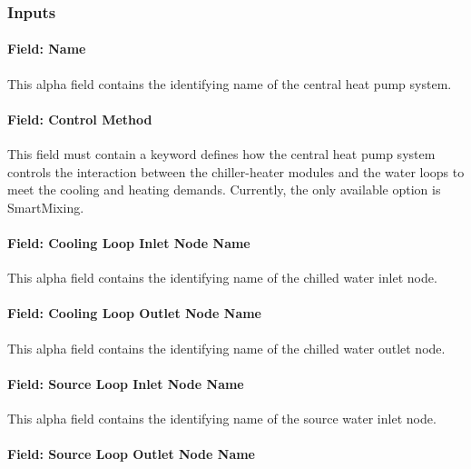 \subsubsection{Inputs}\label{inputs-19-004}

\paragraph{Field: Name}\label{field-name-18-005}

This alpha field contains the identifying name of the central heat pump system.

\paragraph{Field: Control Method}\label{field-control-method}

This field must contain a keyword defines how the central heat pump system controls the interaction between the chiller-heater modules and the water loops to meet the cooling and heating demands. Currently, the only available option is SmartMixing.

\paragraph{Field: Cooling Loop Inlet Node Name}\label{field-cooling-loop-inlet-node-name}

This alpha field contains the identifying name of the chilled water inlet node.

\paragraph{Field: Cooling Loop Outlet Node Name}\label{field-cooling-loop-outlet-node-name}

This alpha field contains the identifying name of the chilled water outlet node.

\paragraph{Field: Source Loop Inlet Node Name}\label{field-source-loop-inlet-node-name}

This alpha field contains the identifying name of the source water inlet node.

\paragraph{Field: Source Loop Outlet Node Name}\label{field-source-loop-outlet-node-name}

